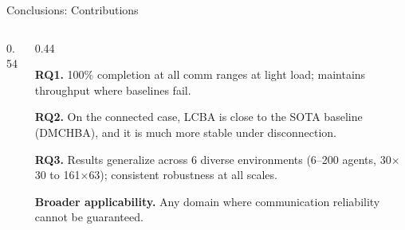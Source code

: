 \documentclass[aspectratio=169, 11pt]{beamer}
\newcommand{\rqlabel}[1]{\textcolor{AccentNavyDeep}{\rmfamily\bfseries #1}}
\begin{document}
\begin{frame}{Conclusions: Contributions}
\begin{columns}[T]
\begin{column}{0.54\textwidth}
    \end{column}

    \begin{column}{0.44\textwidth}
      \vspace{-0.5cm}
      \begin{infobox}
        {\rmfamily\footnotesize
        \rqlabel{RQ1.} 100\% completion at all comm ranges at light
        load; maintains throughput where baselines fail.

        \vspace{4pt}
        \rqlabel{RQ2.} On the connected case, LCBA is close to the
        SOTA baseline (DMCHBA), and it is much more stable under
        disconnection.

        \vspace{4pt}
        \rqlabel{RQ3.} Results generalize across 6 diverse
        environments (6--200 agents, 30$\times$30 to 161$\times$63);
        consistent robustness at all scales.
        }
      \end{infobox}
      \vspace{1pt}
      \begin{warnbox}
        {\rmfamily\footnotesize
        \textbf{Broader applicability.} Any domain where
        communication reliability cannot be guaranteed.
        }
      \end{warnbox}
    \end{column}
  \end{columns}
\end{frame}
\end{document}
